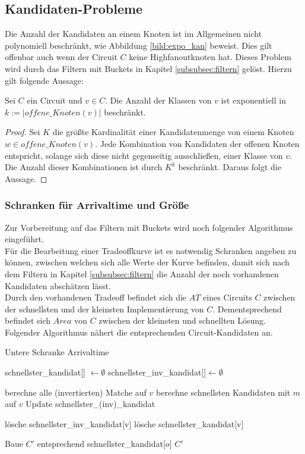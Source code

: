 \documentclass[11pt, a4paper, german]{article}
\begin{document}
\subsection{Kandidaten-Probleme}
\label{subsec:kand_prob}
Die Anzahl der Kandidaten an einem Knoten ist im Allgemeinen nicht polynomiell beschränkt, wie Abbildung \ref{bild:expo_kan} beweist. Dies gilt offenbar auch wenn der Circuit $C$ keine Highfanoutknoten hat. Dieses Problem wird durch das Filtern mit Buckets in Kapitel \ref{subsubsec:filtern} gelöst. Hierzu gilt folgende Aussage:
\begin{cor}
Sei $C$ ein Circuit und $v \in C$. Die Anzahl der Klassen von $v$ ist exponentiell in $k:= |offene\_Knoten(v)|$ beschränkt.
\end{cor}
\begin{proof}
Sei $K$ die größte Kardinalität einer Kandidatenmenge von einem Knoten $w\in offene\_Knoten(v)$. Jede Kombination von Kandidaten der offenen Knoten entspricht, solange sich diese nicht gegenseitig ausschließen, einer Klasse von $v$. Die Anzahl dieser Kombinationen ist durch $K^k$ beschränkt. Daraus folgt die Aussage.
\end{proof}

\subsubsection{Schranken für Arrivaltime und Größe}
\label{subsubsec:schrankenalgo}
Zur Vorbereitung auf das Filtern mit Buckets wird noch folgender Algorithmus eingeführt.\\
Für die Bearbeitung einer Tradeoffkurve ist es notwendig Schranken angeben zu können, zwischen welchen sich alle Werte der Kurve befinden, damit sich nach dem Filtern in Kapitel \ref{subsubsec:filtern} die Anzahl der noch vorhandenen Kandidaten abschätzen lässt. \\
Durch den vorhandenen Tradeoff befindet sich die $AT$ eines Circuits $C$ zwischen der schnellsten und der kleinsten Implementierung von $C$. Dementsprechend befindet sich $Area$ von $C$ zwischen der kleinsten und schnellten Lösung. Folgender Algorithmus nähert die entsprechenden Circuit-Kandidaten an.\\

\begin{algorithm}[H]
 \LinesNumbered
 \DontPrintSemicolon
 \caption{Untere Schranke Arrivaltime}

 schnellster\_kandidat[] $\gets \emptyset$\;
 schnellster\_inv\_kandidat[]$ \gets \emptyset$\;
 {
   berechne alle (invertierten) Matche auf $v$\;
   {
      berechne schnellsten Kandidaten mit $m$ auf $v$\;
      Update schnellster\_(inv)\_kandidat\;
   }
   {
      
      {
	l\"osche schnellster\_inv\_kandidat[v]\;
      }
      \Else
      {
	l\"osche schnellster\_kandidat[v]\;
      }
   }
 }
 Baue $C'$ entsprechend schnellster\_kandidat[$o$]\;
 \Return $C'$\;
\end{algorithm}\ \\
\end{document}
